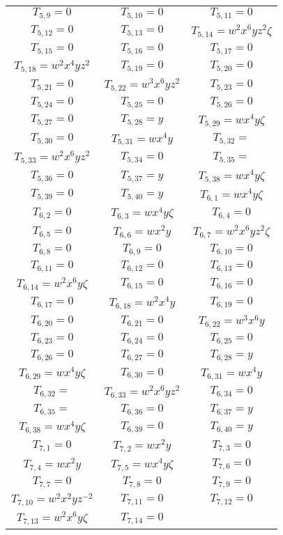 \documentclass[12pt]{memoireuqam1.3}
\begin{document}
\begin{longtable}{|c|c|c|}
$T_{5,9}= 0$&
$T_{5,10}= 0$&
$T_{5,11}= 0$\\
$T_{5,12}= 0$&
$T_{5,13}= 0$&
$T_{5,14}= w^2x^6yz^2\zeta$\\
$T_{5,15}= 0$&
$T_{5,16}= 0$&
$T_{5,17}= 0$\\
$T_{5,18}= w^2x^4yz^2$&
$T_{5,19}= 0$&
$T_{5,20}= 0$\\
$T_{5,21}= 0$&
$T_{5,22}= w^3x^6yz^2$&
$T_{5,23}= 0$\\
$T_{5,24}= 0$&
$T_{5,25}= 0$&
$T_{5,26}= 0$\\
$T_{5,27}= 0$&
$T_{5,28}= y$&
$T_{5,29}= wx^4y\zeta$\\
$T_{5,30}= 0$&
$T_{5,31}= wx^4y$&
$T_{5,32}= $\\
$T_{5,33}= w^2x^6yz^2$&
$T_{5,34}= 0$&
$T_{5,35}= $\\
$T_{5,36}= 0$&
$T_{5,37}= y$&
$T_{5,38}= wx^4y\zeta$\\
$T_{5,39}= 0$&
$T_{5,40}= y$&
$T_{6,1}= wx^4y\zeta$\\
$T_{6,2}= 0$&
$T_{6,3}= wx^4y\zeta$&
$T_{6,4}= 0$\\
$T_{6,5}= 0$&
$T_{6,6}= wx^2y$&
$T_{6,7}= w^2x^6yz^2\zeta$\\
$T_{6,8}= 0$&
$T_{6,9}= 0$&
$T_{6,10}= 0$\\
$T_{6,11}= 0$&
$T_{6,12}= 0$&
$T_{6,13}= 0$\\
$T_{6,14}= w^2x^6y\zeta$&
$T_{6,15}= 0$&
$T_{6,16}= 0$\\
$T_{6,17}= 0$&
$T_{6,18}= w^2x^4y$&
$T_{6,19}= 0$\\
$T_{6,20}= 0$&
$T_{6,21}= 0$&
$T_{6,22}= w^3x^6y$\\
$T_{6,23}= 0$&
$T_{6,24}= 0$&
$T_{6,25}= 0$\\
$T_{6,26}= 0$&
$T_{6,27}= 0$&
$T_{6,28}= y$\\
$T_{6,29}= wx^4y\zeta$&
$T_{6,30}= 0$&
$T_{6,31}= wx^4y$\\
$T_{6,32}= $&
$T_{6,33}= w^2x^6yz^2$&
$T_{6,34}= 0$\\
$T_{6,35}= $&
$T_{6,36}= 0$&
$T_{6,37}= y$\\
$T_{6,38}= wx^4y\zeta$&
$T_{6,39}= 0$&
$T_{6,40}= y$\\
$T_{7,1}= 0$&
$T_{7,2}= wx^2y$&
$T_{7,3}= 0$\\
$T_{7,4}= wx^2y$&
$T_{7,5}= wx^4y\zeta$&
$T_{7,6}= 0$\\
$T_{7,7}= 0$&
$T_{7,8}= 0$&
$T_{7,9}= 0$\\
$T_{7,10}= w^2x^2yz^{-2}$&
$T_{7,11}= 0$&
$T_{7,12}= 0$\\
$T_{7,13}= w^2x^6y\zeta$&
$T_{7,14}= 0$&

\end{longtable}
\end{document}
